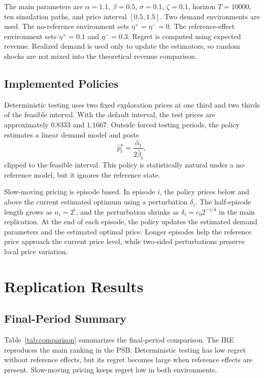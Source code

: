 \documentclass[conference]{../../LaTex_Template/IEEEtran}
\begin{document}
The main parameters are $\alpha=1.1$, $\beta=0.5$, $\sigma=0.1$, $\zeta=0.1$, horizon $T=10000$, ten simulation paths, and price interval $[0.5,1.5]$. Two demand environments are used. The no-reference environment sets $\eta^+=\eta^-=0$. The reference-effect environment sets $\eta^+=0.1$ and $\eta^-=0.3$. Regret is computed using expected revenue. Realized demand is used only to update the estimators, so random shocks are not mixed into the theoretical revenue comparison.

\subsection{Implemented Policies}
Deterministic testing uses two fixed exploration prices at one third and two thirds of the feasible interval. With the default interval, the test prices are approximately $0.8333$ and $1.1667$. Outside forced testing periods, the policy estimates a linear demand model and posts
\begin{equation}
\hat p_t^\star = \frac{\hat\alpha_t}{2\hat\beta_t},
\end{equation}
clipped to the feasible interval. This policy is statistically natural under a no-reference model, but it ignores the reference state.

Slow-moving pricing is episode based. In episode $i$, the policy prices below and above the current estimated optimum using a perturbation $\delta_i$. The half-episode length grows as $n_i=2^i$, and the perturbation shrinks as $\delta_i=c_0 2^{-i/4}$ in the main replication. At the end of each episode, the policy updates the estimated demand parameters and the estimated optimal price. Longer episodes help the reference price approach the current price level, while two-sided perturbations preserve local price variation.

\section{Replication Results}
\subsection{Final-Period Summary}
Table~\ref{tab:comparison} summarizes the final-period comparison. The IRE reproduces the main ranking in the PSB. Deterministic testing has low regret without reference effects, but its regret becomes large when reference effects are present. Slow-moving pricing keeps regret low in both environments.
\end{document}
